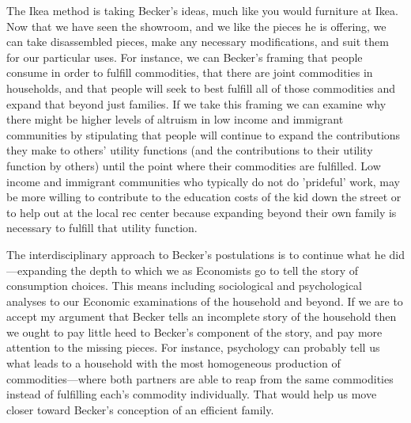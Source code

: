 \documentclass{article}
\begin{document}
The Ikea method is taking Becker's ideas, much like you would furniture at Ikea. Now that we have seen the showroom, and we like the pieces he is offering, we can take disassembled pieces, make any necessary modifications, and suit them for our particular uses. For instance, we can Becker's framing that people consume in order to fulfill commodities, that there are joint commodities in households, and that people will seek to best fulfill all of those commodities and expand that beyond just families. If we take this framing we can examine why there might be higher levels of altruism in low income and immigrant communities by stipulating that people will continue to expand the contributions they make to others' utility functions (and the contributions to their utility function by others) until the point where their commodities are fulfilled. Low income and immigrant communities who typically do not do 'prideful' work, may be more willing to contribute to the education costs of the kid down the street or to help out at the local rec center because expanding beyond their own family is necessary to fulfill that utility function.

The interdisciplinary approach to Becker's postulations is to continue what he did—expanding the depth to which we as Economists go to tell the story of consumption choices. This means including sociological and psychological analyses to our Economic examinations of the household and beyond. If we are to accept my argument that Becker tells an incomplete story of the household then we ought to pay little heed to Becker's component of the story, and pay more attention to the missing pieces. For instance, psychology can probably tell us what leads to a household with the most homogeneous production of commodities—where both partners are able to reap from the same commodities instead of fulfilling each's commodity individually. That would help us move closer toward Becker's conception of an efficient family. 
\end{document}
